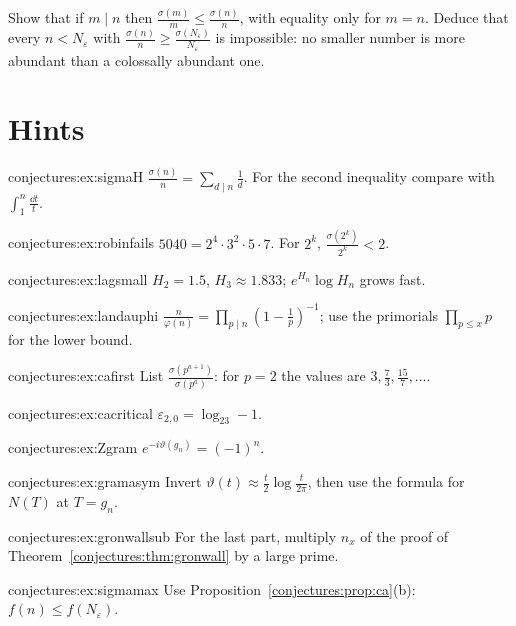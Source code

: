 \begin{exercise}[$\star$]\label{conjectures:ex:sigmamax}
Show that if $m\mid n$ then $\frac{\sigma(m)}m\le\frac{\sigma(n)}n$, with equality only for $m=n$. Deduce that every $n<N_\varepsilon$ with $\frac{\sigma(n)}n\ge\frac{\sigma(N_\varepsilon)}{N_\varepsilon}$ is
impossible: no smaller number is more abundant than a colossally abundant one.
\end{exercise}

\section{Hints}

\begin{hint}{conjectures:ex:sigmaH}
$\frac{\sigma(n)}n=\sum_{d\mid n}\frac1d$. For the second inequality compare with $\int_1^n\frac{\dd t}t$.
\end{hint}
\begin{hint}{conjectures:ex:robinfails}
$5040=2^4\cdot3^2\cdot5\cdot7$. For $2^k$, $\frac{\sigma(2^k)}{2^k}<2$.
\end{hint}
\begin{hint}{conjectures:ex:lagsmall}
$H_2=1.5$, $H_3\approx1.833$; $e^{H_n}\log H_n$ grows fast.
\end{hint}
\begin{hint}{conjectures:ex:landauphi}
$\frac n{\varphi(n)}=\prod_{p\mid n}(1-\frac1p)^{-1}$; use the primorials $\prod_{p\le x}p$ for the lower bound.
\end{hint}
\begin{hint}{conjectures:ex:cafirst}
List $\frac{\sigma(p^{a+1})}{\sigma(p^a)}$: for $p=2$ the values are $3,\frac73,\frac{15}7,\dots$.
\end{hint}
\begin{hint}{conjectures:ex:cacritical}
$\varepsilon_{2,0}=\log_23-1$.
\end{hint}
\begin{hint}{conjectures:ex:Zgram}
$e^{-i\vartheta(g_n)}=(-1)^n$.
\end{hint}
\begin{hint}{conjectures:ex:gramasym}
Invert $\vartheta(t)\approx\frac t2\log\frac t{2\pi}$, then use the formula for $N(T)$ at $T=g_n$.
\end{hint}
\begin{hint}{conjectures:ex:gronwallsub}
For the last part, multiply $n_x$ of the proof of Theorem~\ref{conjectures:thm:gronwall} by a large prime.
\end{hint}
\begin{hint}{conjectures:ex:sigmamax}
Use Proposition~\ref{conjectures:prop:ca}(b): $f(n)\le f(N_\varepsilon)$.
\end{hint}

